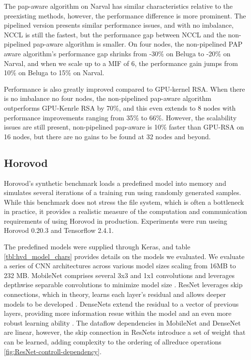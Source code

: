 The pap-aware algorithm on Narval has similar characteristics relative to the preexisting methods, however, the performance difference is more prominent.
The pipelined version presents similar performance issues, and with no imbalance, NCCL is still the fastest, but the performance gap between NCCL and the non-pipelined pap-aware algorithm is smaller.
On four nodes, the non-pipelined PAP aware algorithm's performance gap shrinks from -30\% on Beluga to -20\% on Narval, and when we scale up to a MIF of 6, the performance gain jumps from 10\% on Beluga to 15\% on Narval.

Performance is also greatly improved compared to GPU-kernel RSA.
When there is no imbalance no four nodes, the non-pipelined pap-aware algorithm outperforms GPU-Kenrle RSA by 70\%, and this even extends to 8 nodes with performance improvements ranging from 35\% to 66\%.
However, the scalability issues are still present, non-pipelined pap-aware is 10\% faster than GPU-RSA on 16 nodes, but there are no gains to be found at 32 nodes and beyond.

\subsection{Horovod}\label{sec:CH5-eval-horovod}
Horovod's synthetic benchmark loads a predefined model into memory and simulates several iterations of a training run using randomly generated samples.
While this benchmark does not stress the file system, which is often a bottleneck in practice, it provides a realistic measure of the computation and communication requirements of using Horovod in production.
Experiments were run useing Horovod 0.20.3 and Tensorflow 2.4.1.



The predefined models were supplied through Keras, and table \ref{tbl:hvd_model_chars} provides details on the models we evaluated.
We evaluate a series of CNN architectures across various model sizes scaling from 16MB to 232 MB.
MobileNet comprises several 3x3 and 1x1 convolutions and leverages depthwise separable convolutions to minimize model size \cite{Howard2017MobileNet}.
ResNet leverages skip connections, which in theory, learns each layer's residual and allows deeper models to be developed \cite{He2015ResNet}.
DenseNets extend the residual to a vector of previous layers, providing more information resue within the model and an even more robust learning ability \cite{Huang2016DenseNet}.
The dataflow dependencies in MobileNet and DenseNet are linear, however, the skip connection in ResNets introduce a set of weight that can be learned, adding complexity to the ordering of allreduce operations \ref{fig:ResNet-controll-dependency}.

